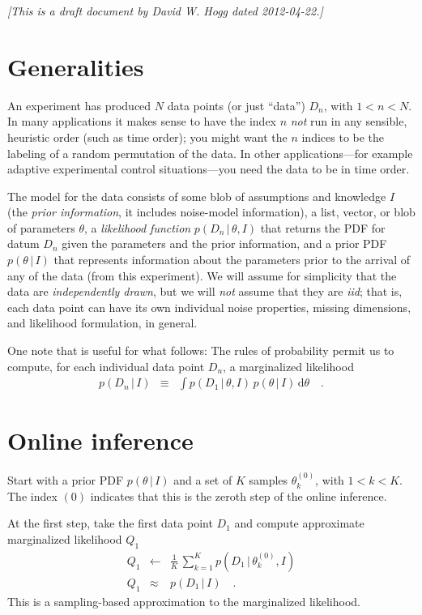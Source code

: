 \documentclass[12pt]{article}
\newcommand{\dd}{\mathrm{d}}
\newcommand{\given}{\,|\,}
\newcommand{\info}{I}
\newcommand{\pars}{\theta}
\newcommand{\sample}[2]{\pars^{({#1})}_{#2}}
\newcommand{\datum}[1]{D_{#1}}
\begin{document}
\noindent\textsl{[This is a draft document by David W. Hogg dated 2012-04-22.]}

\section{Generalities}

An experiment has produced $N$ data points (or just ``data'')
$\datum{n}$, with $1<n<N$.  In many applications it makes sense to
have the index $n$ \emph{not} run in any sensible, heuristic order
(such as time order); you might want the $n$ indices to be the
labeling of a random permutation of the data.  In other
applications---for example adaptive experimental control
situations---you need the data to be in time order.

The model for the data consists of some blob of assumptions and
knowledge $\info$ (the \emph{prior information}, it includes
noise-model information), a list, vector, or blob of parameters
$\pars$, a \emph{likelihood function} $p(\datum{n}\given\pars,\info)$
that returns the PDF for datum $\datum{n}$ given the parameters and
the prior information, and a prior PDF $p(\pars\given\info)$ that
represents information about the parameters prior to the arrival of
any of the data (from this experiment).  We will assume for simplicity
that the data are \emph{independently drawn}, but we will \emph{not}
assume that they are \emph{iid}; that is, each data point can have
its own individual noise properties, missing dimensions, and
likelihood formulation, in general.

One note that is useful for what follows: The rules of probability
permit us to compute, for each individual data point $\datum{n}$, a
marginalized likelihood
\begin{eqnarray}\displaystyle
p(\datum{n}\given\info) &\equiv& \int p(\datum{1}\given\pars,\info)\,p(\pars\given\info)\,\dd\pars
\quad .
\end{eqnarray}

\section{Online inference}

Start with a prior PDF $p(\pars\given\info)$ and a set of $K$ samples
$\sample{0}{k}$, with $1<k<K$.  The index $(0)$ indicates that this is
the zeroth step of the online inference.

At the first step, take the first data point $\datum{1}$ and compute
approximate marginalized likelihood $Q_1$
\begin{eqnarray}\displaystyle
Q_1 &\leftarrow& \frac{1}{K}\,\sum_{k=1}^K p(\datum{1}\given\sample{0}{k},\info)
\\
Q_1 &\approx& p(\datum{1}\given\info)
\quad .
\end{eqnarray}
This is a sampling-based approximation to the marginalized likelihood.
\end{document}
